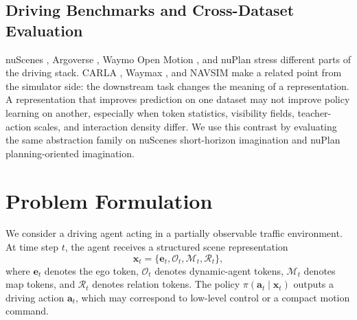 \documentclass[10pt,journal,compsoc]{IEEEtran}
\begin{document}

\subsection{Driving Benchmarks and Cross-Dataset Evaluation}
nuScenes \cite{caesar2020nuscenes}, Argoverse \cite{chang2019argoverse,wilson2023argoverse2}, Waymo Open Motion \cite{sun2020scalability,ettinger2021large}, and nuPlan \cite{caesar2021nuplan} stress different parts of the driving stack. CARLA \cite{dosovitskiy2017carla}, Waymax \cite{mao2023waymax}, and NAVSIM \cite{dauner2024navsim} make a related point from the simulator side: the downstream task changes the meaning of a representation. A representation that improves prediction on one dataset may not improve policy learning on another, especially when token statistics, visibility fields, teacher-action scales, and interaction density differ. We use this contrast by evaluating the same abstraction family on nuScenes short-horizon imagination and nuPlan planning-oriented imagination.

\section{Problem Formulation}
We consider a driving agent acting in a partially observable traffic environment. At time step $t$, the agent receives a structured scene representation
\begin{equation}
\mathbf{x}_t = \{\mathbf{e}_t, \mathcal{O}_t, \mathcal{M}_t, \mathcal{R}_t\},
\label{eq:state}
\end{equation}
where $\mathbf{e}_t$ denotes the ego token, $\mathcal{O}_t$ denotes dynamic-agent tokens, $\mathcal{M}_t$ denotes map tokens, and $\mathcal{R}_t$ denotes relation tokens. The policy $\pi(\mathbf{a}_t \mid \mathbf{x}_t)$ outputs a driving action $\mathbf{a}_t$, which may correspond to low-level control or a compact motion command.
\end{document}
